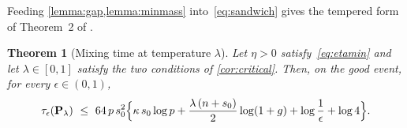 \documentclass[aos]{imsart}
\theoremstyle{plain}
\newtheorem{theorem}{Theorem}[section]
\theoremstyle{definition}
\newtheorem{remark}{Remark}[section]
\begin{document}
    Feeding \cref{lemma:gap,lemma:minmass} into~\eqref{eq:sandwich} gives
    the tempered form of Theorem~2 of \citet{YangWainwrightJordan2016}.

    \begin{theorem}[Mixing time at temperature $\lambda$]
        \label{th:mixing}
        Let $\eta>0$ satisfy~\eqref{eq:etamin} and let
        $\lambda\in[0,1]$ satisfy the two conditions of
        \cref{cor:critical}. Then, on the good event, for every
        $\epsilon\in(0,1)$,
        \begin{equation}
            \label{eq:tau}
            \tau_\epsilon(\mathbf{P}_\lambda)\ \leq\
            64\,p\,s_0^{2}\Bigl\{\kappa\,s_0\log p
            +\frac{\lambda\,(n+s_0)}{2}\log(1+g)
            +\log\frac1\epsilon+\log4\Bigr\} .
        \end{equation}
    \end{theorem}


%
%
%
%
\end{document}
